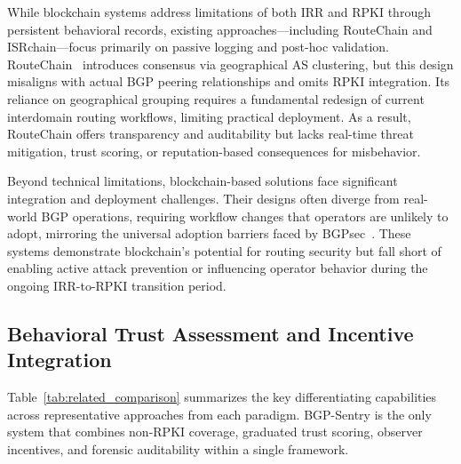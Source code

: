 While blockchain systems address limitations of both IRR and RPKI through persistent behavioral records, existing approaches—including RouteChain and ISRchain—focus primarily on passive logging and post-hoc validation. RouteChain~\cite{saad2022routechain} introduces consensus via geographical AS clustering, but this design misaligns with actual BGP peering relationships and omits RPKI integration. Its reliance on geographical grouping requires a fundamental redesign of current interdomain routing workflows, limiting practical deployment. As a result, RouteChain offers transparency and auditability but lacks real-time threat mitigation, trust scoring, or reputation-based consequences for misbehavior.

Beyond technical limitations, blockchain-based solutions face significant integration and deployment challenges. Their designs often diverge from real-world BGP operations, requiring workflow changes that operators are unlikely to adopt, mirroring the universal adoption barriers faced by BGPsec~\cite{lychev2013bgpsec}. These systems demonstrate blockchain's potential for routing security but fall short of enabling active attack prevention or influencing operator behavior during the ongoing IRR-to-RPKI transition period.

\subsection{Behavioral Trust Assessment and Incentive Integration}

Table~\ref{tab:related_comparison} summarizes the key differentiating capabilities across representative approaches from each paradigm. BGP-Sentry is the only system that combines non-RPKI coverage, graduated trust scoring, observer incentives, and forensic auditability within a single framework.

